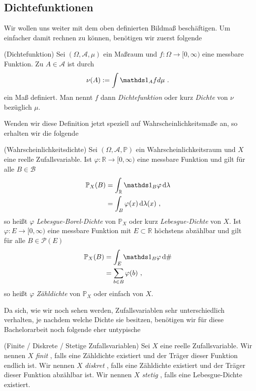 \subsection{Dichtefunktionen}

Wir wollen uns weiter mit dem oben definierten Bildmaß beschäftigen. Um einfacher damit rechnen zu können, benötigen wir zuerst folgende

\begin{Definition}{(Dichtefunktion)}
Sei $(\Omega, \mathscr{A}, \mu)$ ein Maßraum und $f: \Omega \rightarrow [0, \infty)$ eine messbare Funktion. Zu $A \in \mathscr{A}$ ist durch
\[\nu(A) := \int \indi_{A} f d \mu~.\]
ein Maß definiert. Man nennt $f$ dann \textit{Dichtefunktion} oder kurz \textit{Dichte}  von $\nu$ bezüglich $\mu$.
\end{Definition}

\newpage

Wenden wir diese Definition jetzt speziell auf Wahrscheinlichkeitsmaße an, so erhalten wir die folgende

\begin{Definition}{(Wahrscheinlichkeitsdichte)}
Sei $(\Omega, \mathscr{A}, \mathbb{P})$ ein Wahrscheinlichkeitsraum und $X$ eine reelle Zufallsvariable. Ist $\varphi: \mathbb{R} \rightarrow [0, \infty)$ eine messbare Funktion und gilt für alle $B \in \mathscr{B}$
\begin{align*}
\mathbb{P}_X(B) &= \int_{\mathbb{R}} \indi_B \varphi \d \lambda\\
&= \int_B \varphi(x) \d \lambda(x)~,
\end{align*}
so heißt $\varphi$ \textit{Lebesgue-Borel-Dichte} von $\mathbb{P}_X$ oder kurz \textit{Lebesgue-Dichte} von $X$. Ist $\varphi: E \rightarrow [0, \infty)$ eine messbare Funktion mit $E \subset \mathbb{R}$ höchstens abzählbar und gilt für alle $B \in \mathcal{P}(E)$
\begin{align*}
\mathbb{P}_X(B) &= \int_{E} \indi_B \varphi \d \#\\
&= \sum_{b \in B} \varphi(b)~,
\end{align*}
so heißt $\varphi$ \textit{Zähldichte} von $\mathbb{P}_X$ oder einfach von $X$.
\end{Definition}

Da sich, wie wir noch sehen werden, Zufallsvariablen sehr unterschiedlich verhalten, je nachdem welche Dichte sie besitzen, benötigen wir für diese Bachelorarbeit noch folgende eher untypische

\begin{Definition}{(Finite / Diskrete / Stetige Zufallsvariablen)}
\hypertarget{Def:Dichtefunktion}{}Sei $X$ eine reelle Zufallsvariable. Wir nennen $X$ \textit{finit} , falls eine Zähldichte existiert und der Träger dieser Funktion endlich ist. Wir nennen $X$ \textit{diskret} , falls eine Zähldichte existiert und der Träger dieser Funktion abzählbar ist. Wir nennen $X$ \textit{stetig} , falls eine Lebesgue-Dichte existiert.
\end{Definition}

